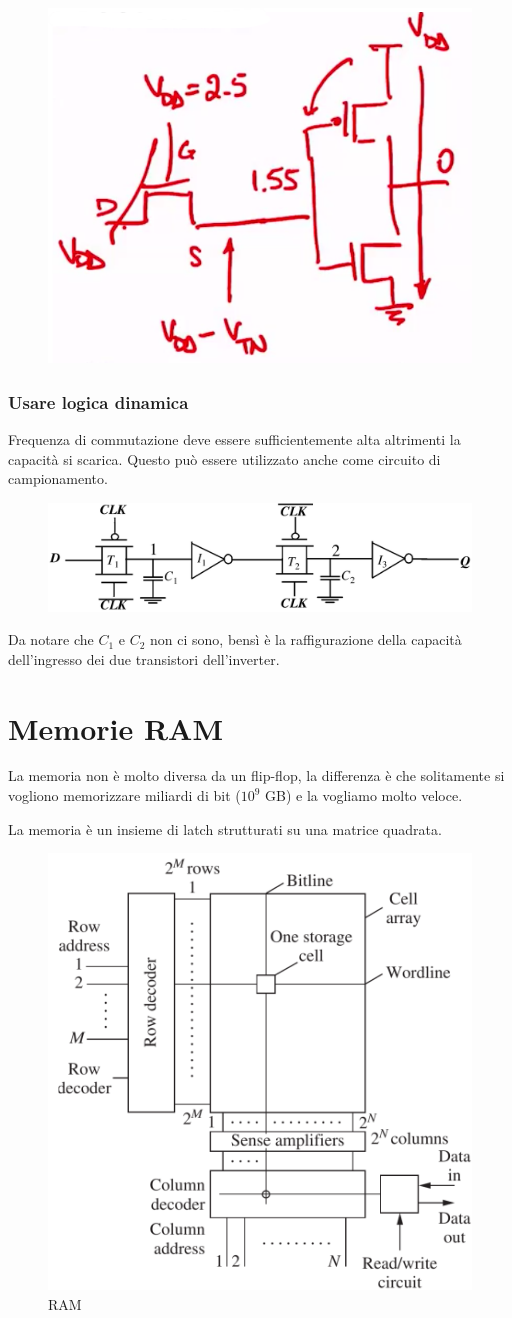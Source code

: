 \begin{figure}[htbp]
    \centering
    \includegraphics[width=0.35\linewidth]{img/problema_pass.png}
\end{figure}

\newpage
\subsection{Usare logica dinamica}

Frequenza di commutazione deve essere sufficientemente alta altrimenti la capacità si scarica. Questo può essere utilizzato anche come circuito di campionamento.

\begin{figure}[htbp]
    \centering
    \includegraphics[width=0.7\linewidth]{img/alternatva3.png}
\end{figure}

Da notare che $C_1$ e $C_2$ non ci sono, bensì è la raffigurazione della capacità dell'ingresso dei due transistori dell'inverter.
 

\newpage
\chapter{Memorie RAM}

La memoria non è molto diversa da un flip-flop, la differenza è che solitamente si vogliono memorizzare miliardi di bit ($10^9$ GB) e la vogliamo molto veloce.

La memoria è un insieme di latch strutturati su una matrice quadrata. 


\begin{figure}[htbp]
    \centering
    \includegraphics[width=0.5\linewidth]{img/ram.png}
    \caption{RAM}
\end{figure}

